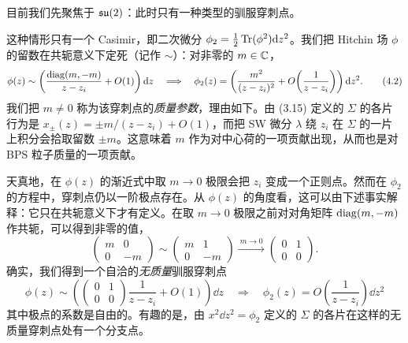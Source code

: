  目前我们先聚焦于 $\mathfrak{su}(2)$：此时只有一种类型的驯服穿刺点。

这种情形只有一个 Casimir，即二次微分 $\phi_2=\frac12\operatorname{Tr}(\phi^2)\mathrm{d} z^2$。我们把 Hitchin 场 $\phi$ 的留数在共轭意义下定死（记作 $\sim$）：对非零的 $m\in\mathbb{C}$，
\begin{equation}
  \phi(z)\sim\left(\frac{\operatorname{diag}(m,-m)}{z-z_i}+O(1)\right)\mathrm{d} z
  \quad\Longrightarrow\quad
  \phi_2(z)=\left(\frac{m^2}{(z-z_i)^2}+O\!\left(\frac{1}{z-z_i}\right)\right)\mathrm{d} z^2.
  \tag{4.2}
\end{equation}
我们把 $m\neq 0$ 称为该穿刺点的\textit{质量参数}，理由如下。由 (3.15) 定义的 $\Sigma$ 的各片行为是 $x_\pm(z)=\pm m/(z-z_i)+O(1)$，而把 SW 微分 $\lambda$ 绕 $z_i$ 在 $\Sigma$ 的一片上积分会拾取留数 $\pm m$。这意味着 $m$ 作为对中心荷的一项贡献出现，从而也是对 BPS 粒子质量的一项贡献。

天真地，在 $\phi(z)$ 的渐近式中取 $m\to 0$ 极限会把 $z_i$ 变成一个正则点。然而在 $\phi_2$ 的方程中，穿刺点仍以一阶极点存在。从 $\phi(z)$ 的角度看，这可以由下述事实解释：它只在共轭意义下才有定义。在取 $m\to0$ 极限之前对对角矩阵 $\operatorname{diag}(m,-m)$ 作共轭，可以得到非零的值，
\begin{equation}
  \begin{pmatrix} m & 0 \\ 0 & -m \end{pmatrix}
  \sim
  \begin{pmatrix} m & 1 \\ 0 & -m \end{pmatrix}
  \xrightarrow{\ m\to 0\ }
  \begin{pmatrix} 0 & 1 \\ 0 & 0 \end{pmatrix}.
  \tag{4.3}
\end{equation}
确实，我们得到一个自洽的\textit{无质量}驯服穿刺点
\begin{equation}
  \phi(z)\sim\left(\begin{pmatrix} 0 & 1 \\ 0 & 0 \end{pmatrix}\frac{1}{z-z_i}+O(1)\right)\dd z
  \quad\Longrightarrow\quad
  \phi_2(z)=O\!\left(\frac{1}{z-z_i}\right)\dd z^2
  \tag{4.4}
\end{equation}
其中极点的系数是自由的。有趣的是，由 $x^2\dd z^2=\phi_2$ 定义的 $\Sigma$ 的各片在这样的无质量穿刺点处有一个分支点。



